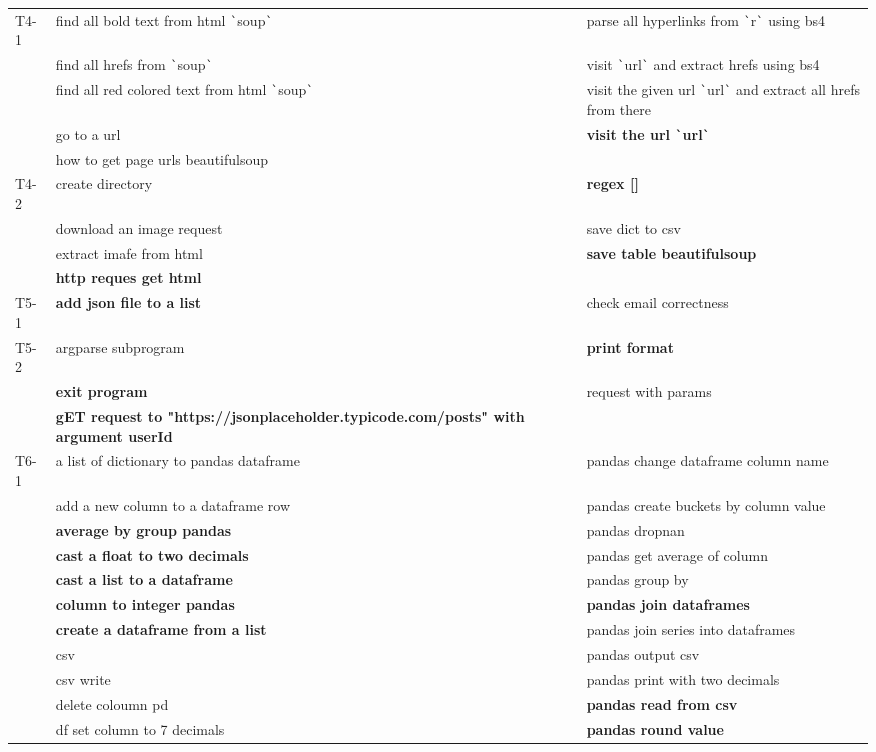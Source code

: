 \begin{longtable}{lLL}
T4-1 & find all bold text from html \texttt{\`}soup\texttt{\`} & parse all hyperlinks from \texttt{\`}r\texttt{\`} using bs4 \\
& find all hrefs from \texttt{\`}soup\texttt{\`} & visit \texttt{\`}url\texttt{\`} and extract hrefs using bs4 \\
& find all red colored text from html \texttt{\`}soup\texttt{\`} & visit the given url \texttt{\`}url\texttt{\`} and extract all hrefs from there \\
& go to a url & \textbf{visit the url \texttt{\`}url\texttt{\`}} \\
& how to get page urls beautifulsoup \\
T4-2 & create directory & \textbf{regex []} \\
& download an image request & save dict to csv \\
& extract imafe from html & \textbf{save table beautifulsoup} \\
& \textbf{http reques get html} \\
T5-1 & \textbf{add json file to a list} & check email correctness \\
T5-2 & argparse subprogram & \textbf{print format} \\
& \textbf{exit program} & request with params \\
& \textbf{gET request to "https://jsonplaceholder.typicode.com/posts" with argument userId} \\
T6-1 & a list of dictionary to pandas dataframe & pandas change dataframe column name \\
& add a new column to a dataframe row & pandas create buckets by column value \\
& \textbf{average by group pandas} & pandas dropnan \\
& \textbf{cast a float to two decimals} & pandas get average of column \\
& \textbf{cast a list to a dataframe} & pandas group by \\
& \textbf{column to integer pandas} & \textbf{pandas join dataframes} \\
& \textbf{create a dataframe from a list} & pandas join series into dataframes \\
& csv & pandas output csv \\
& csv write & pandas print with two decimals \\
& delete coloumn pd & \textbf{pandas read from csv} \\
& df set column to 7 decimals & \textbf{pandas round value} \\

\end{longtable}
